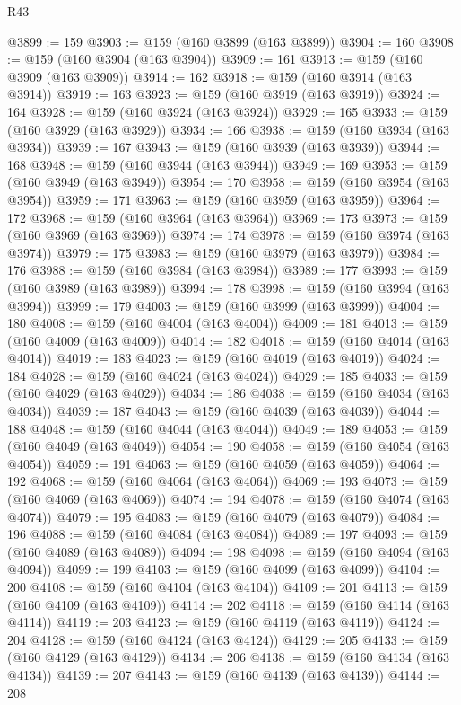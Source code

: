 \begin{lexlean}{R43}
\begin{coremodule}
@3899 := 159
@3903 := @159 (@160 @3899 (@163 @3899))
@3904 := 160
@3908 := @159 (@160 @3904 (@163 @3904))
@3909 := 161
@3913 := @159 (@160 @3909 (@163 @3909))
@3914 := 162
@3918 := @159 (@160 @3914 (@163 @3914))
@3919 := 163
@3923 := @159 (@160 @3919 (@163 @3919))
@3924 := 164
@3928 := @159 (@160 @3924 (@163 @3924))
@3929 := 165
@3933 := @159 (@160 @3929 (@163 @3929))
@3934 := 166
@3938 := @159 (@160 @3934 (@163 @3934))
@3939 := 167
@3943 := @159 (@160 @3939 (@163 @3939))
@3944 := 168
@3948 := @159 (@160 @3944 (@163 @3944))
@3949 := 169
@3953 := @159 (@160 @3949 (@163 @3949))
@3954 := 170
@3958 := @159 (@160 @3954 (@163 @3954))
@3959 := 171
@3963 := @159 (@160 @3959 (@163 @3959))
@3964 := 172
@3968 := @159 (@160 @3964 (@163 @3964))
@3969 := 173
@3973 := @159 (@160 @3969 (@163 @3969))
@3974 := 174
@3978 := @159 (@160 @3974 (@163 @3974))
@3979 := 175
@3983 := @159 (@160 @3979 (@163 @3979))
@3984 := 176
@3988 := @159 (@160 @3984 (@163 @3984))
@3989 := 177
@3993 := @159 (@160 @3989 (@163 @3989))
@3994 := 178
@3998 := @159 (@160 @3994 (@163 @3994))
@3999 := 179
@4003 := @159 (@160 @3999 (@163 @3999))
@4004 := 180
@4008 := @159 (@160 @4004 (@163 @4004))
@4009 := 181
@4013 := @159 (@160 @4009 (@163 @4009))
@4014 := 182
@4018 := @159 (@160 @4014 (@163 @4014))
@4019 := 183
@4023 := @159 (@160 @4019 (@163 @4019))
@4024 := 184
@4028 := @159 (@160 @4024 (@163 @4024))
@4029 := 185
@4033 := @159 (@160 @4029 (@163 @4029))
@4034 := 186
@4038 := @159 (@160 @4034 (@163 @4034))
@4039 := 187
@4043 := @159 (@160 @4039 (@163 @4039))
@4044 := 188
@4048 := @159 (@160 @4044 (@163 @4044))
@4049 := 189
@4053 := @159 (@160 @4049 (@163 @4049))
@4054 := 190
@4058 := @159 (@160 @4054 (@163 @4054))
@4059 := 191
@4063 := @159 (@160 @4059 (@163 @4059))
@4064 := 192
@4068 := @159 (@160 @4064 (@163 @4064))
@4069 := 193
@4073 := @159 (@160 @4069 (@163 @4069))
@4074 := 194
@4078 := @159 (@160 @4074 (@163 @4074))
@4079 := 195
@4083 := @159 (@160 @4079 (@163 @4079))
@4084 := 196
@4088 := @159 (@160 @4084 (@163 @4084))
@4089 := 197
@4093 := @159 (@160 @4089 (@163 @4089))
@4094 := 198
@4098 := @159 (@160 @4094 (@163 @4094))
@4099 := 199
@4103 := @159 (@160 @4099 (@163 @4099))
@4104 := 200
@4108 := @159 (@160 @4104 (@163 @4104))
@4109 := 201
@4113 := @159 (@160 @4109 (@163 @4109))
@4114 := 202
@4118 := @159 (@160 @4114 (@163 @4114))
@4119 := 203
@4123 := @159 (@160 @4119 (@163 @4119))
@4124 := 204
@4128 := @159 (@160 @4124 (@163 @4124))
@4129 := 205
@4133 := @159 (@160 @4129 (@163 @4129))
@4134 := 206
@4138 := @159 (@160 @4134 (@163 @4134))
@4139 := 207
@4143 := @159 (@160 @4139 (@163 @4139))
@4144 := 208

\end{coremodule}
\end{lexlean}
